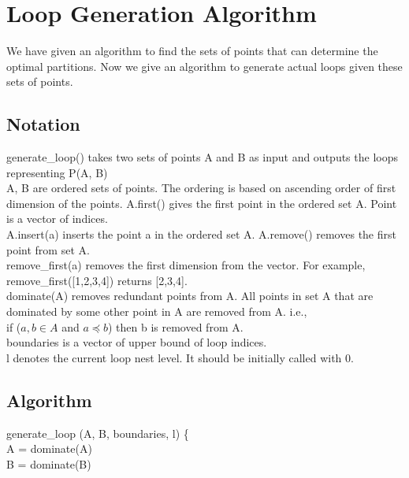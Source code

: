 \chapter{Loop Generation Algorithm}
We have given an algorithm to find the sets of points that can determine the optimal partitions. Now we give an algorithm to generate actual loops given these sets of points. \\

\section{Notation}

generate\_loop() takes two sets of points A and B as input and outputs the loops representing P(A, B) \\

A, B are ordered sets of points. The ordering is based on ascending order of first dimension of the points. A.first() gives the first point in the ordered set A. Point is a vector of indices. \\

A.insert(a) inserts the point a in the ordered set A. A.remove() removes the first point from set A. \\

remove\_first(a) removes the first dimension from the vector. For example, remove\_first([1,2,3,4]) returns [2,3,4]. \\

dominate(A) removes redundant points from A. All points in set A that are dominated by some other point in A are removed from A. i.e., \\
if ($a,b \in A$ and $a \preceq b$) then b is removed from A. \\

boundaries is a vector of upper bound of loop indices.\\

l denotes the current loop nest level. It should be initially called with 0. \\


\section{Algorithm}


generate\_loop (A, B, boundaries, l) \{ \\

\indent	A = dominate(A) \\
\indent	B = dominate(B) \\

